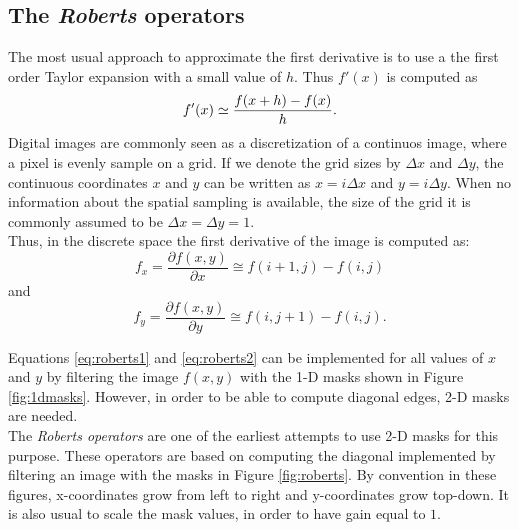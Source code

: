\documentclass{ipol}
\numberwithin{equation}{section}
\numberwithin{table}{section}
\begin{document}
{%

\subsection{The \textit{Roberts} operators}

\myn{\label{correction_a:first_derivative:taylor}}The most usual approach to approximate the first derivative is to use a the first order Taylor expansion with a small value of $h$. Thus $f'(x)$ is computed as
\begin{equation}
	f'(x) \simeq \frac{f(x+h) - f(x)}{h}.\\
\end{equation}
\myn{\label{correction_a:first_derivative:discretization}} Digital images are commonly seen as a discretization of a continuos image, where a pixel is evenly sample on a grid. If we denote the grid sizes by $\Delta x$ and $\Delta y$, the continuous coordinates $x$  and $y$ can be written as $x=i\Delta x$ and $y=i\Delta y$. When no information about the spatial sampling is available, the size of the grid it is commonly assumed to be $\Delta x=\Delta y=1$.\\
Thus, in the discrete space the first derivative of the image is computed as:
\begin{equation}
\label{eq:roberts1}
	f_x = \frac{\partial f(x,y)}{\partial x} \cong f(i+1,j) - f(i,j)
\end{equation}
and
\begin{equation}
\label{eq:roberts2}
	f_y = \frac{\partial f(x,y)}{\partial y} \cong f(i,j+1) - f(i,j).
\end{equation}

\myn{\label{correction_a:first_derivative:diagonal edges}} Equations \ref{eq:roberts1} and \ref{eq:roberts2} can be implemented for all values of $x$ and $y$ by filtering the image $f(x,y)$ with the 1-D masks shown in Figure \ref{fig:1dmasks}. However, in order to be able to compute diagonal edges, 2-D masks are needed. \\
The \textit{Roberts operators} are one of the earliest 
attempts to use 2-D masks for this purpose. These operators are based on computing the diagonal  \myn{\label{correction_a:typo}} implemented by filtering an image with the masks in Figure \ref{fig:roberts}. By convention 
in these figures, x-coordinates grow from left to right and y-coordinates grow top-down. It is also 
usual to scale the mask values, in order to have gain equal to $1$. \\

}
\end{document}
